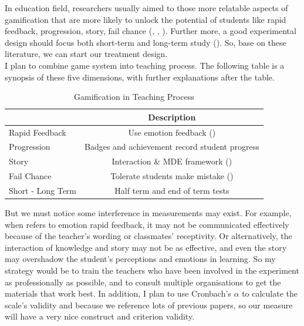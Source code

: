 \documentclass[12pt]{article} %
\begin{document}
\noindent In education field, researchers usually aimed to those more relatable aspects of gamification that are more likely to unlock the potential of students like rapid feedback, progression, story, fail chance (\cite{stott2013analysis}, \cite{caponetto2014gamification}, \cite{arnold2014gamification}). Further more, a good experimental design should focus both short-term and long-term study (\cite{hallifax2019adaptive}). So, base on these literature, we can start our treatment design.\\

\noindent I plan to combine game system into teaching process. The following table is a synopsis of these five dimensions, with further explanations after the table. \\
\newpage
\begin{table}[ht]
	\centering
	\caption{Gamification in Teaching Process}
	\begin{tabular}{lc}
		\toprule
		  & Description \\
		\midrule
		Rapid Feedback &  Use emotion feedback (\cite{hassan2019motivational})\\
		Progression &  Badges and achievement record student progress \\ 
		Story &  Interaction \& MDE framework (\cite{robson2015all}) \\
		Fail Chance & Tolerate students make mistake (\cite{manzano2021between})\\
		Short - Long Term & Half term and end of term tests \\
		\bottomrule
	\end{tabular} 
\end{table}
\noindent But we must notice some interference in measurements may exist. For example, when refers to emotion rapid feedback, it may not be communicated effectively because of the teacher's wording or classmates' receptivity. Or alternatively, the interaction of knowledge and story may not be as effective, and even the story may overshadow the student's perceptions and emotions in learning. So my strategy would be to train the teachers who have been involved in the experiment as professionally as possible, and to consult multiple organisations to get the materials that work best. In addition, I plan to use Cronbach's $\alpha$ to calculate the scale's validity and because we reference lots of previous papers, so our measure will have a very nice construct and criterion validity.\\
\end{document}
